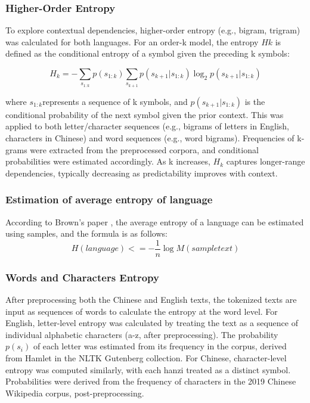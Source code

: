 \documentclass[12pt]{article}
\begin{document}
\subsubsection*{\centering Higher-Order Entropy}
To explore contextual dependencies, higher-order entropy (e.g., bigram, trigram) was calculated for both languages. For an order-k  model, the entropy $Hk$ is defined as the conditional entropy of a symbol given the preceding k symbols:

\begin{equation}
H_k = - \sum_{s_{1:k}} p(s_{1:k}) \sum_{s_{k+1}} p(s_{k+1} | s_{1:k}) \log_2 p(s_{k+1} | s_{1:k})
\end{equation}

where $s_{1:k}$​ represents a sequence of k symbols, and $p(s_{k+1} | s_{1:k})$ is the conditional probability of the next symbol given the prior context. This was applied to both letter/character sequences (e.g., bigrams of letters in English, characters in Chinese) and word sequences (e.g., word bigrams). Frequencies of k-grams were extracted from the preprocessed corpora, and conditional probabilities were estimated accordingly. As k increases, $H_k$ captures longer-range dependencies, typically decreasing as predictability improves with context.
\subsubsection*{\centering Estimation of average entropy of language}
According to Brown's paper \cite{brown1992}, the average entropy of a language can be estimated using samples, and the formula is as follows:
\begin{equation}
    H(language)<=−\frac{1}{n}\log M(sample text)
\end{equation}
\subsubsection*{\centering Words and Characters Entropy} 
After preprocessing both the Chinese and English texts, the tokenized texts are input as sequences of words to calculate the entropy at the word level.
For English, letter-level entropy was calculated by treating the text as a sequence of individual alphabetic characters (a-z, after preprocessing). The probability  $p(s_i) $ of each letter was estimated from its frequency in the corpus, derived from Hamlet in the NLTK Gutenberg collection. For Chinese, character-level entropy was computed similarly, with each hanzi treated as a distinct symbol. Probabilities were derived from the frequency of characters in the 2019 Chinese Wikipedia corpus, post-preprocessing. 
\end{document}
